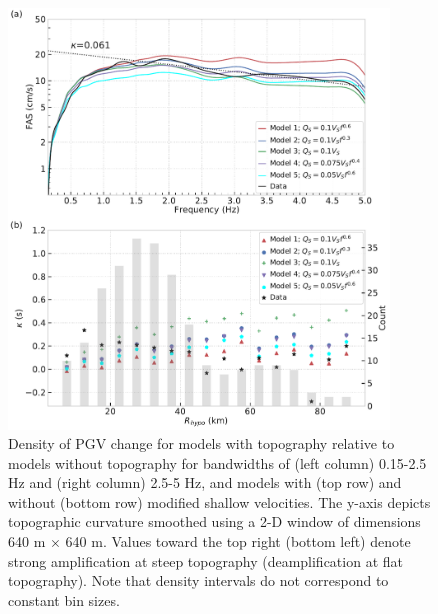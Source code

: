 \begin{figure}[!ht]
  \centering
  \includegraphics[width=0.9\textwidth,height=0.9\textheight,keepaspectratio]{figures/figure_highf_14.pdf}
  \caption{
 Density of PGV change for models with topography relative to models without topography for bandwidths of (left column) 0.15-2.5 Hz and (right column) 2.5-5 Hz, and models with (top row) and without (bottom row) modified shallow velocities. The y-axis depicts topographic curvature smoothed using a 2-D window of dimensions 640 m $\times$ 640 m. Values toward the top right (bottom left) denote strong amplification at steep topography (deamplification at flat topography). Note that density intervals do not correspond to constant bin sizes.}
  \label{fig:highf-14}
\end{figure}
\clearpage


